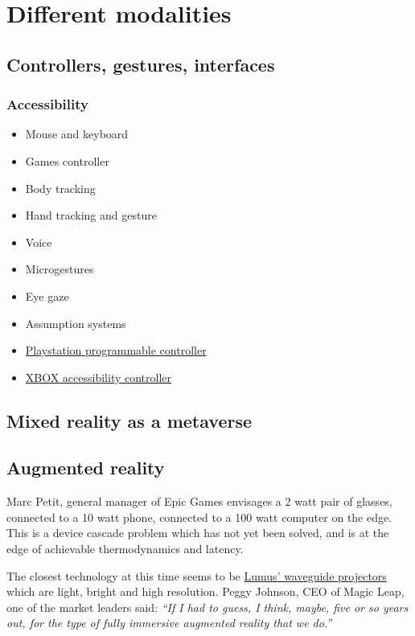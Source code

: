 \section{Different modalities}
\subsection{Controllers, gestures, interfaces}
\subsubsection{Accessibility}
\begin{itemize}
\item Mouse and keyboard
\item Games controller
\item Body tracking
\item Hand tracking and gesture
\item Voice
\item Microgestures
\item Eye gaze
\item Assumption systems
\item \href{https://blog.playstation.com/2023/01/04/introducing-project-leonardo-for-playstation-5-a-highly-customizable-accessibility-controller-kit/}{Playstation programmable controller}
\item \href{https://www.xbox.com/en-GB/accessories/controllers/xbox-adaptive-controller}{XBOX accessibility controller}
\end{itemize}
\subsection{Mixed reality as a metaverse}

\subsection{Augmented reality}
Marc Petit, general manager of Epic Games envisages a 2 watt pair of glasses, connected to a 10 watt phone, connected to a 100 watt computer on the edge. This is a device cascade problem which has not yet been solved, and is at the edge of achievable thermodynamics and latency.\par
The closest technology at this time seems to be \href{https://lumusvision.com/}{Lumus' waveguide projectors} which are light, bright and high resolution. 
Peggy Johnson, CEO of Magic Leap, one of the market leaders said: \textit{``If I had to guess, I think, maybe, five or so years out, for the type of fully immersive augmented reality that we do.''}
